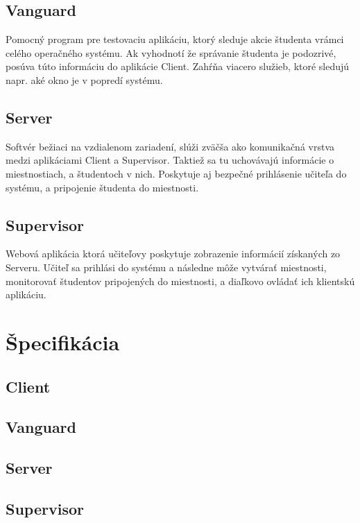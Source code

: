 \documentclass{article}
\begin{document}
\subsection{Vanguard}

Pomocný program pre testovaciu aplikáciu, ktorý sleduje akcie študenta vrámci celého operačného systému. Ak vyhodnotí že správanie študenta je podozrivé, posúva túto informáciu do aplikácie Client. Zahŕňa viacero služieb, ktoré sledujú napr. aké okno je v popredí systému.

\subsection{Server}

Softvér bežiaci na vzdialenom zariadení, slúži zväčša ako komunikačná vrstva medzi aplikáciami Client a Supervisor. Taktiež sa tu uchovávajú informácie o miestnostiach, a študentoch v nich. Poskytuje aj bezpečné prihlásenie učiteľa do systému, a pripojenie študenta do miestnosti.

\subsection{Supervisor}

Webová aplikácia ktorá učiteľovy poskytuje zobrazenie informácií získaných zo Serveru. Učiteľ sa prihlási do systému a následne môže vytvárať miestnosti, monitorovať študentov pripojených do miestnosti, a diaľkovo ovládať ich klientskú aplikáciu.

\section{Špecifikácia}

\subsection{Client}

\subsection{Vanguard}

\subsection{Server}

\subsection{Supervisor}
\end{document}
